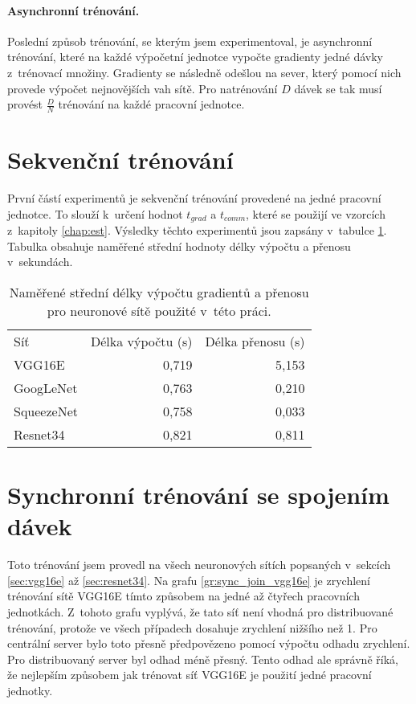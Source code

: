 \paragraph{Asynchronní trénování.}
Poslední způsob trénování, se kterým jsem experimentoval, je asynchronní trénování, které na každé výpočetní jednotce vypočte gradienty jedné dávky z~trénovací množiny.
Gradienty se následně odešlou na sever, který pomocí nich provede výpočet nejnovějších vah sítě.
Pro natrénování $D$ dávek se tak musí provést $\frac{D}{N}$ trénování na každé pracovní jednotce.

\section{Sekvenční trénování}
\label{sec:res_seq}

První částí experimentů je sekvenční trénování provedené na jedné pracovní jednotce.
To slouží k~určení hodnot $t_{grad}$ a $t_{comm}$, které se použijí ve vzorcích z~kapitoly \ref{chap:est}.
Výsledky těchto experimentů jsou zapsány v~tabulce \ref{table:res_seq}.
Tabulka obsahuje naměřené střední hodnoty délky výpočtu a přenosu v~sekundách.

\begin{table}
\centering
\begin{tabular}{l|r|r}
    Síť & Délka výpočtu (s) & Délka přenosu (s)\\
    \hhline{=|=|=}
    VGG16E & 0,719 & 5,153\\
    GoogLeNet & 0,763 & 0,210\\
    SqueezeNet & 0,758 & 0,033\\
    Resnet34 & 0,821 & 0,811\\
\end{tabular}
\caption{Naměřené střední délky výpočtu gradientů a přenosu pro neuronové sítě použité v~této práci.}
\label{table:res_seq}
\end{table}

\section{Synchronní trénování se spojením dávek}
\label{sec:res_sync_join}

Toto trénování jsem provedl na všech neuronových sítích popsaných v~sekcích \ref{sec:vgg16e} až \ref{sec:resnet34}.
Na grafu \ref{gr:sync_join_vgg16e} je zrychlení trénování sítě VGG16E tímto způsobem na jedné až čtyřech pracovních jednotkách.
Z~tohoto grafu vyplývá, že tato síť není vhodná pro distribuované trénování, protože ve všech případech dosahuje zrychlení nižšího než 1.
Pro centrální server bylo toto přesně předpovězeno pomocí výpočtu odhadu zrychlení.
Pro distribuovaný server byl odhad méně přesný.
Tento odhad ale správně říká, že nejlepším způsobem jak trénovat síť VGG16E je použití jedné pracovní jednotky.

